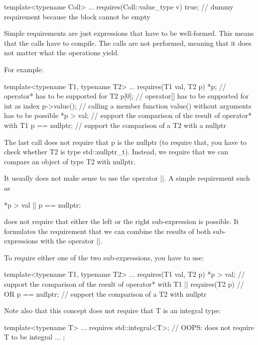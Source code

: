 \begin{cpp}
template<typename Coll>
... requires(Coll::value_type v) {
		true; // dummy requirement because the block cannot be empty
	}
\end{cpp}


Simple requirements are just expressions that have to be well-formed. This means that the calls have to compile. The calls are not performed, meaning that it does not matter what the operations yield.

For example:

\begin{cpp}
template<typename T1, typename T2>
... requires(T1 val, T2 p) {
		*p; // operator* has to be supported for T2
		p[0]; // operator[] has to be supported for int as index
		p->value(); // calling a member function value() without arguments has to be possible
		*p > val; // support the comparison of the result of operator* with T1
		p == nullptr; // support the comparison of a T2 with a nullptr
	}
\end{cpp}

The last call does not require that p is the nullptr (to require that, you have to check whether T2 is type std::nullptr\_t). Instead, we require that we can compare an object of type T2 with nullptr.

It usually does not make sense to use the operator ||. A simple requirement such as

\begin{cpp}
*p > val || p == nullptr;
\end{cpp}

does not require that either the left or the right sub-expression is possible. It formulates the requirement that we can combine the results of both sub-expressions with the operator ||.

To require either one of the two sub-expressions, you have to use:

\begin{cpp}
template<typename T1, typename T2>
... requires(T1 val, T2 p) {
		*p > val; // support the comparison of the result of operator* with T1
	}
	|| requires(T2 p) { // OR
		p == nullptr; // support the comparison of a T2 with nullptr
	}
\end{cpp}

Note also that this concept does not require that T is an integral type:

\begin{cpp}
template<typename T>
... requires {
		std::integral<T>; // OOPS: does not require T to be integral
		...
	};
\end{cpp}

